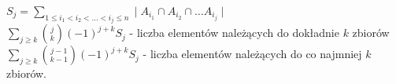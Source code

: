 $S_j = \sum\limits_{1\leq i_1<i_2<\ldots<i_j\leq n} \mid A_{i_1}\cap A_{i_2} \cap \ldots A_{i_j} \mid$\\
$\sum\limits_{j\geq k}{j \choose k}(-1)^{j + k}S_j$ - liczba elementów należących do dokładnie $k$ zbiorów\\
$\sum\limits_{j\geq k}{j - 1 \choose k - 1}(-1)^{j + k}S_j$ - liczba elementów należących do co najmniej $k$ zbiorów.

